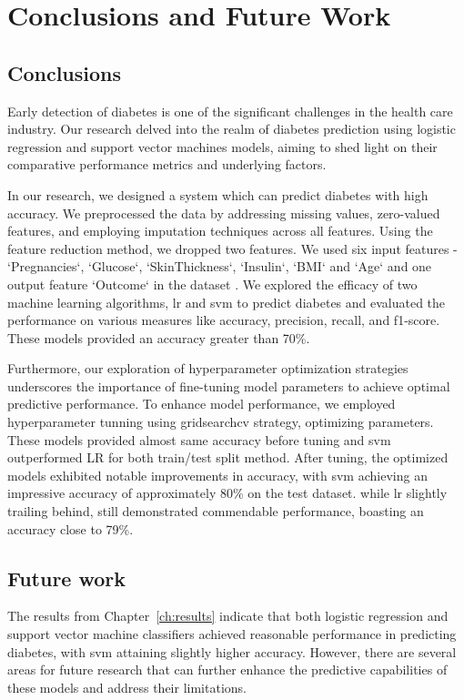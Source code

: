 \chapter{Conclusions and Future Work}
\label{ch:con}
\section{Conclusions}
Early detection of diabetes is one of the significant challenges in the health care industry. Our research delved into the realm of diabetes prediction using logistic regression and support vector machines models, aiming to shed light on their comparative performance metrics and underlying factors. 

In our research, we designed a system which can predict diabetes with high accuracy. We preprocessed the data by addressing missing values, zero-valued features, and employing imputation techniques across all features. Using the feature reduction method, we dropped two features. We used six input features - `Pregnancies`, `Glucose`, `SkinThickness`, `Insulin`, `BMI` and `Age` and one output feature `Outcome` in the  dataset \citep{dataset}. We explored the efficacy of two machine learning algorithms, lr and svm to predict diabetes and evaluated the performance on various measures like accuracy, precision, recall, and f1-score. These models provided an accuracy greater than 70\%. 

Furthermore, our exploration of hyperparameter optimization strategies underscores the importance of fine-tuning model parameters to achieve optimal predictive performance. To enhance model performance, we employed hyperparameter tunning using gridsearchcv strategy, optimizing parameters. These models provided almost same accuracy before tuning and svm outperformed LR for both train/test split method. After tuning, the optimized models exhibited notable improvements in accuracy, with svm achieving an impressive accuracy of approximately 80\% on the test dataset. while lr slightly trailing behind, still demonstrated commendable performance, boasting an accuracy close to 79\%.

\section{Future work}
The results from Chapter~\ref{ch:results} indicate that both logistic regression and support vector machine classifiers achieved reasonable performance in predicting diabetes, with svm attaining slightly higher accuracy. However, there are several areas for future research that can further enhance the predictive capabilities of these models and address their limitations.

